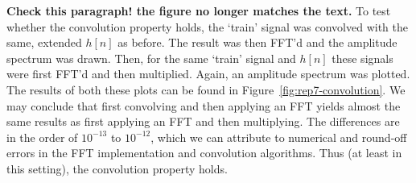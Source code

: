 \documentclass[11pt,titlepage]{report}
\begin{document}
\textbf{Check this paragraph! the figure no longer matches the text.}
To test whether the convolution property holds, the `train' signal was convolved with the same, extended $h[n]$ as before. The result was then FFT'd and the amplitude spectrum was drawn. Then, for the same `train' signal and $h[n]$ these signals were first FFT'd and then multiplied. Again, an amplitude spectrum was plotted. The results of both these plots can be found in Figure~\ref{fig:rep7-convolution}. We may conclude that first convolving and then applying an FFT yields almost the same results as first applying an FFT and then multiplying. The differences are in the order of $10^{-13}$ to $10^{-12}$, which we can attribute to numerical and round-off errors in the FFT implementation and convolution algorithms. Thus (at least in this setting), the convolution property holds.
\end{document}
